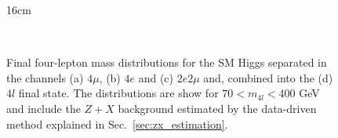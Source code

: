 \begin{figure}[hbtp]{16cm}
	\caption{Final four-lepton mass distributions for the SM Higgs separated in the channels (a) $4\mu$, (b) $4e$ and (c) $2e2\mu$ and, combined into the (d) $4l$ final state. The distributions are show for $70 < m_{4l} < 400$ GeV and include the $Z+X$ background estimated by the data-driven method explained in Sec.~\ref{sec:zx_estimation}.}
	\centering
	\\

\end{figure}

